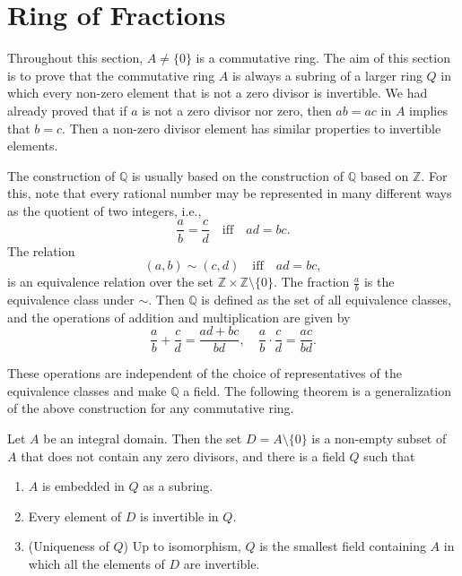 \documentclass[11pt,a4paper]{article}
\begin{document}
\def\contador{Lesson 13}


\section{Ring of Fractions}



Throughout this section, $A \neq \{0\}$ is a commutative ring. The aim of this section is to prove that the commutative ring $A$ is always a subring of a larger ring $Q$ in which every non-zero element that is not a zero divisor is invertible. We had already proved that if $a$ is not a zero divisor nor zero, then $ab = ac$ in $A$ implies that $b = c$. Then a non-zero divisor element has similar properties to invertible elements.

The construction of $\mathbb{Q}$ is usually based on the construction of $\mathbb{Q}$ based on $\mathbb{Z}$. For this, note that every rational number may be represented in many different ways as the quotient of two integers, i.e.,
\[
\frac{a}{b} = \frac{c}{d} \quad \text{iff} \quad ad = bc.
\]
The relation
\[
(a, b) \sim (c, d) \quad \text{iff} \quad ad = bc,
\]
is an equivalence relation over the set $\mathbb{Z} \times \mathbb{Z} \setminus \{0\}$. The fraction $\frac{a}{b}$ is the equivalence class under $\sim$. Then $\mathbb{Q}$ is defined as the set of all equivalence classes, and the operations of addition and multiplication are given by
\[
\frac{a}{b} + \frac{c}{d} = \frac{ad + bc}{bd}, \quad \frac{a}{b} \cdot \frac{c}{d} = \frac{ac}{bd}.
\]

These operations are independent of the choice of representatives of the equivalence classes and make $\mathbb{Q}$ a field. The following theorem is a generalization of the above construction for any commutative ring.

\begin{teo} 
Let $A$ be an integral domain. Then the set $D = A \setminus \{0\}$ is a non-empty subset of $A$ that does not contain any zero divisors, and there is a field $Q$ such that
\begin{enumerate}[label=(\roman*)]
    \item $A$ is embedded in $Q$ as a subring.
    \item Every element of $D$ is invertible in $Q$.
    \item (Uniqueness of $Q$) Up to isomorphism, $Q$ is the smallest field containing $A$ in which all the elements of $D$ are invertible.
\end{enumerate}
\end{teo}
\end{document}

